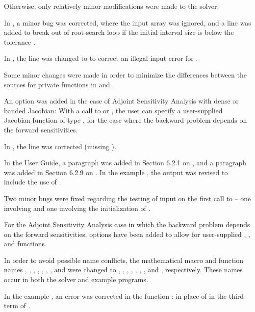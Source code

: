 Otherwise, only relatively minor modifications were made to the
{\cvodes} solver:

In , a minor bug was corrected, where the input
array  was ignored, and a line was added to break out of
root-search loop if the initial interval size is below the tolerance
.

In , the line  was changed to
 to correct an illegal input error for .

Some minor changes were made in order to minimize the differences
between the sources for private functions in {\cvodes} and {\cvode}.

An option was added in the case of Adjoint Sensitivity Analysis with
dense or banded Jacobian:  With a call to  or
, the user can specify a user-supplied Jacobian
function of type , for the case where the backward
problem depends on the forward sensitivities.

In , the line 
was corrected (missing ).

In the User Guide, a paragraph was added in Section 6.2.1 on
, and a paragraph was added in Section 6.2.9 on
.  In the example , the output
was revised to include the use of .

Two minor bugs were fixed regarding the testing of input on the first
call to  -- one involving  and one involving the
initialization of .

For the Adjoint Sensitivity Analysis case in which the backward problem
depends on the forward sensitivities, options have been added to allow
for user-supplied , , and  functions.

In order to avoid possible name conflicts, the mathematical macro
and function names , , , , ,
, , and  were changed to
, , , , ,
, , and , respectively.
These names occur in both the solver and example programs.

In the example , an error was corrected in the
function :  in place of  in the third term of
.

